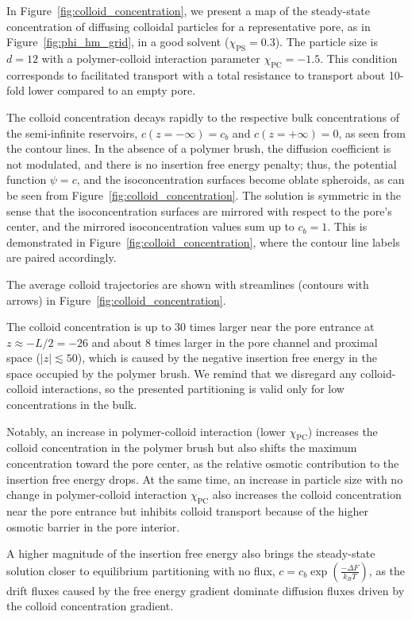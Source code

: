 \documentclass[12pt, a4paper]{article}
\begin{document}
In Figure~\ref{fig:colloid_concentration}, we present a map of the steady-state concentration of diffusing colloidal particles for a representative pore, as in Figure~\ref{fig:phi_hm_grid}, in a good solvent ($\chi_{\textrm{PS}} = 0.3$).
The particle size is $d = 12$ with a polymer-colloid interaction parameter $\chi_{\textrm{PC}} = -1.5$.
This condition corresponds to facilitated transport with a total resistance to transport about 10-fold lower compared to an empty pore.

The colloid concentration decays rapidly to the respective bulk concentrations of the semi-infinite reservoirs, $c(z = -\infty) = c_{b}$ and $c(z = +\infty) = 0$, as seen from the contour lines.
In the absence of a polymer brush, the diffusion coefficient is not modulated, and there is no insertion free energy penalty; thus, the potential function $\psi = c$, and the isoconcentration surfaces become oblate spheroids, as can be seen from Figure~\ref{fig:colloid_concentration}.
The solution is symmetric in the sense that the isoconcentration surfaces are mirrored with respect to the pore's center, and the mirrored isoconcentration values sum up to $c_{b} = 1$.
This is demonstrated in Figure~\ref{fig:colloid_concentration}, where the contour line labels are paired accordingly.

The average colloid trajectories are shown with streamlines (contours with arrows) in Figure~\ref{fig:colloid_concentration}.

The colloid concentration is up to 30 times larger near the pore entrance at $z \approx -L/2 = -26$ and about 8 times larger in the pore channel and proximal space ($|z| \lesssim 50$), which is caused by the negative insertion free energy in the space occupied by the polymer brush.
We remind that we disregard any colloid-colloid interactions, so the presented partitioning is valid only for low concentrations in the bulk.

Notably, an increase in polymer-colloid interaction (lower $\chi_{\textrm{PC}}$) increases the colloid concentration in the polymer brush but also shifts the maximum concentration toward the pore center, as the relative osmotic contribution to the insertion free energy drops.
At the same time, an increase in particle size with no change in polymer-colloid interaction $\chi_{\textrm{PC}}$ also increases the colloid concentration near the pore entrance but inhibits colloid transport because of the higher osmotic barrier in the pore interior.

A higher magnitude of the insertion free energy also brings the steady-state solution closer to equilibrium partitioning with no flux, $c = c_{b} \exp\left( \frac{-\Delta F}{k_B T} \right)$, as the drift fluxes caused by the free energy gradient dominate diffusion fluxes driven by the colloid concentration gradient.
\end{document}

